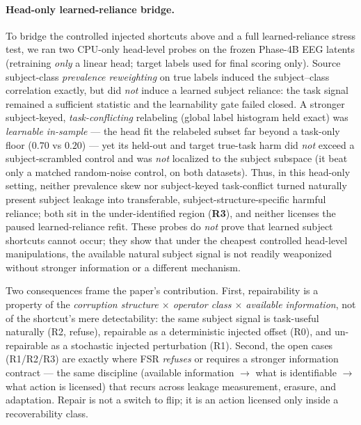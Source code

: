 \begin{table}[t]
\centering\small

\caption{Recoverability obstruction classes (non-exclusive; the binding obstruction sets the licensed action).
Deployable target-$X$-only batch-affine repair reaches only R0; R1/R2/R3 are detected, localized, and refused,
and require stronger information (per-sample side information, a task-preserving inverse, or labels/paired/
randomized data). ``Not repairable'' is scoped to batch-affine operators, not proven for all operators.}
\label{tab:recover}
\end{table}

\paragraph{Head-only learned-reliance bridge.}
To bridge the controlled injected shortcuts above and a full learned-reliance stress test, we ran two
CPU-only head-level probes on the frozen Phase-4B EEG latents (retraining \emph{only} a linear head;
target labels used for final scoring only). Source subject-class \emph{prevalence reweighting} on true
labels induced the subject--class correlation exactly, but did \emph{not} induce a learned subject
reliance: the task signal remained a sufficient statistic and the learnability gate failed closed. A
stronger subject-keyed, \emph{task-conflicting} relabeling (global label histogram held exact) was
\emph{learnable in-sample} --- the head fit the relabeled subset far beyond a task-only floor ($0.70$ vs
$0.20$) --- yet its held-out and target true-task harm did \emph{not} exceed a subject-scrambled control
and was \emph{not} localized to the subject subspace (it beat only a matched random-noise control, on
both datasets). Thus, in this head-only setting, neither prevalence skew nor subject-keyed task-conflict
turned naturally present subject leakage into transferable, subject-structure-specific harmful reliance;
both sit in the under-identified region (\textbf{R3}), and neither licenses the paused learned-reliance
refit. These probes do \emph{not} prove that learned subject shortcuts cannot occur; they show that under
the cheapest controlled head-level manipulations, the available natural subject signal is not readily
weaponized without stronger information or a different mechanism.

Two consequences frame the paper's contribution. First, repairability is a property of the \emph{corruption
structure $\times$ operator class $\times$ available information}, not of the shortcut's mere detectability: the
same subject signal is task-useful naturally (R2, refuse), repairable as a deterministic injected offset (R0), and
un-repairable as a stochastic injected perturbation (R1). Second, the open cases (R1/R2/R3) are exactly where FSR
\emph{refuses} or requires a stronger information contract --- the same discipline (available information $\to$
what is identifiable $\to$ what action is licensed) that recurs across leakage measurement, erasure, and
adaptation. Repair is not a switch to flip; it is an action licensed only inside a recoverability class.
